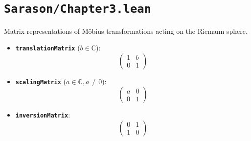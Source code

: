 \documentclass[11pt]{article}
\begin{document}
\section{\texttt{Sarason/Chapter3.lean}}

Matrix representations of Möbius transformations acting on the Riemann sphere.

\begin{itemize}
    \item \textbf{\texttt{translationMatrix}} ($b \in \mathbb{C}$): 
    \[ \begin{pmatrix} 1 & b \\ 0 & 1 \end{pmatrix} \]
    
    \item \textbf{\texttt{scalingMatrix}} ($a \in \mathbb{C}, a \neq 0$): 
    \[ \begin{pmatrix} a & 0 \\ 0 & 1 \end{pmatrix} \]
    
    \item \textbf{\texttt{inversionMatrix}}: 
    \[ \begin{pmatrix} 0 & 1 \\ 1 & 0 \end{pmatrix} \]
\end{itemize}
\end{document}
